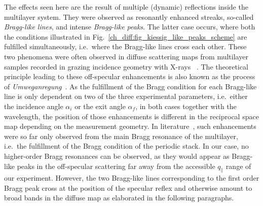 The effects seen here are the result of multiple (dynamic) reflections inside the multilayer system. They were observed as resonantly enhanced streaks, so-called \emph{Bragg-like lines}, and intense \emph{Bragg-like peaks}. The latter case occurs, where both the conditions illustrated in Fig.~\ref{ch_diff:fig_kiessig_like_peaks_scheme} are fulfilled simultaneously, i.e.~where the Bragg-like lines cross each other. These two phenomena were often observed in diffuse scattering maps from multilayer samples recorded in grazing incidence geometry with X-rays ~\cite{holy_nonspecular_1994}. The theoretical principle leading to these off-specular enhancements is also known as the process of \emph{Umweganregung}~\cite{baumbach_influence_1994, baumbach_grazing-incidence_1995}. As the fulfillment of the Bragg condition for each Bragg-like line is only dependent on two of the three experimental parameters, i.e.~either the incidence angle $\alpha_i$ or the exit angle $\alpha_f$, in both cases together with the wavelength, the position of those enhancements is different in the reciprocal space map depending on the measurement geometry. In literature~\cite{holy_nonspecular_1994, mikulik_X-ray_1997, baumbach_influence_1994, baumbach_grazing-incidence_1995}, such enhancements were so far only observed from the main Bragg resonance of the multilayer, i.e.~the fulfillment of the Bragg condition of the periodic stack. In our case, no higher-order Bragg resonances can be observed, as they would appear as Bragg-like peaks in the off-specular scattering far away from the accessible $q_\parallel$ range of our experiment. However, the two Bragg-like lines corresponding to the first order Bragg peak cross at the position of the specular reflex and otherwise amount to broad bands in the diffuse map as elaborated in the following paragraphs.

